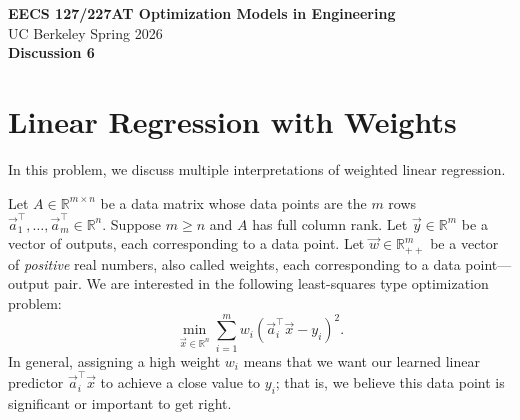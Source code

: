 \documentclass[10pt]{article}
\newcommand{\RR}{\mathbb{R}}
\begin{document}
\begin{center}
    {\Large\bfseries EECS 127/227AT \quad Optimization Models in Engineering}\\[0.5em]
    {\large UC Berkeley \hfill Spring 2026}\\[1em]
    {\LARGE\bfseries Discussion 6}
\end{center}

\section{Linear Regression with Weights}

In this problem, we discuss multiple interpretations of weighted linear regression.

Let $A \in \RR^{m \times n}$ be a data matrix whose data points are the $m$ rows $\vec{a}_1^\top, \ldots, \vec{a}_m^\top \in \RR^n$. Suppose $m \geq n$ and $A$ has full column rank. Let $\vec{y} \in \RR^m$ be a vector of outputs, each corresponding to a data point. Let $\vec{w} \in \RR^m_{++}$ be a vector of \emph{positive} real numbers, also called weights, each corresponding to a data point---output pair. We are interested in the following least-squares type optimization problem:
\begin{equation}
    \min_{\vec{x} \in \RR^n} \sum_{i=1}^{m} w_i (\vec{a}_i^\top \vec{x} - y_i)^2.
\end{equation}
In general, assigning a high weight $w_i$ means that we want our learned linear predictor $\vec{a}_i^\top \vec{x}$ to achieve a close value to $y_i$; that is, we believe this data point is significant or important to get right.
\end{document}
